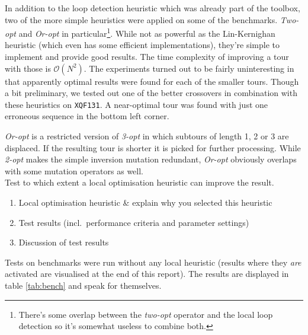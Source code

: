 In addition to the loop detection heuristic which was already part of the toolbox, two of the more simple heuristics were applied on some of the benchmarks. \textit{Two-opt} and \textit{Or-opt} in particular\footnote{There's some overlap between the \textit{two-opt} operator and the local loop detection so it's somewhat useless to combine both.}. While not as powerful as the Lin-Kernighan heuristic (which even has some efficient implementations), they're simple to implement and provide good results. The time complexity of improving a tour with those is $\mathcal{O}(N^2)$. The experiments turned out to be fairly uninteresting in that apparently optimal results were found for each of the smaller tours. Though a bit preliminary, we tested out one of the better crossovers in combination with these heuristics on \texttt{XQF131}. A near-optimal tour was found with just one erroneous sequence in the bottom left corner.\\

\par\noindent \textit{Or-opt} is a restricted version of \textit{3-opt} in which subtours of length 1, 2 or 3 are displaced. If the resulting tour is shorter it is picked for further processing. While \textit{2-opt} makes the simple inversion mutation redundant, \textit{Or-opt} obviously overlaps with some mutation operators as well.\\

Test to which extent a local optimisation heuristic can improve the result.
\begin{enumerate}
\item	Local optimisation heuristic \& explain why you selected this heuristic
\item Test results (incl.\ performance criteria and parameter settings)
\item Discussion of test results

\end{enumerate}


Tests on benchmarks were run without any local heuristic (results where they \textit{are} activated are visualised at the end of this report). The results are displayed in table \ref{tab:bench} and speak for themselves.\\

